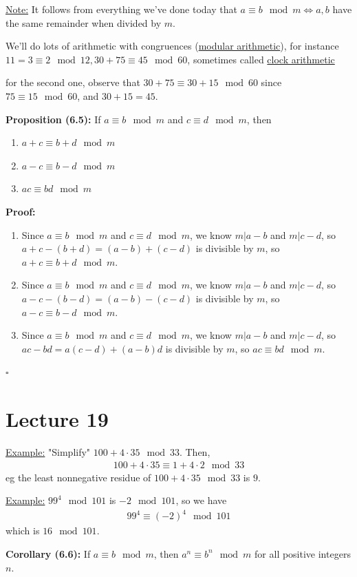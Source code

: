\documentclass{article}
\newcommand*{\qed}{\hfill$\square$}%
\begin{document}
\underline{Note:} It follows from everything we've done today that $a\equiv b\mod m\iff a,b$ have the same remainder when divided by $m$.

We'll do lots of arithmetic with congruences (\underline{modular arithmetic}), for instance $11=3\equiv 2\mod 12, 30+75\equiv 45\mod 60$, sometimes called \underline{clock arithmetic}

for the second one, observe that $30+75\equiv 30+15\mod 60$ since $75\equiv 15\mod 60$, and $30+15=45$.

\textbf{Proposition (6.5):} If $a\equiv b\mod m$ and $c\equiv d\mod m$, then \begin{enumerate}
    \item $a+c\equiv b+d\mod m$
    \item $a-c\equiv b-d\mod m$
    \item $ac\equiv bd\mod m$
\end{enumerate}

\textbf{Proof:} \begin{enumerate}
    \item Since $a\equiv b\mod m$ and $c\equiv d\mod m$, we know $m|a-b$ and $m|c-d$, so $a+c-(b+d)=(a-b)+(c-d)$ is divisible by $m$, so $a+c\equiv b+d\mod m$.
    \item Since $a\equiv b\mod m$ and $c\equiv d\mod m$, we know $m|a-b$ and $m|c-d$, so $a-c-(b-d)=(a-b)-(c-d)$ is divisible by $m$, so $a-c\equiv b-d\mod m$.
    \item Since $a\equiv b\mod m$ and $c\equiv d\mod m$, we know $m|a-b$ and $m|c-d$, so $ac-bd=a(c-d)+(a-b)d$ is divisible by $m$, so $ac\equiv bd\mod m$.
\end{enumerate}\qed

\section{Lecture 19}

\underline{Example:} "Simplify" $100+4\cdot 35\mod 33$. Then, \begin{align*}
    100+4\cdot35\equiv 1+4\cdot 2\mod 33
\end{align*}eg the least nonnegative residue of $100+4\cdot 35\mod 33$ is $9$.

\underline{Example:} $99^4\mod 101$ is $-2\mod 101$, so we have \begin{align*}
    99^4\equiv (-2)^4\mod 101
\end{align*}which is $16\mod 101$.

\textbf{Corollary (6.6):} If $a\equiv b\mod m$, then $a^n\equiv b^n\mod m$ for all positive integers $n$.
\end{document}
